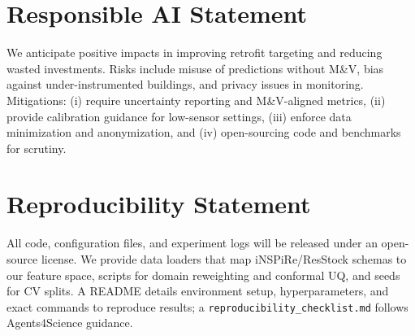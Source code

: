 ﻿\documentclass{article}
\begin{document}
\section*{Responsible AI Statement}
We anticipate positive impacts in improving retrofit targeting and reducing wasted investments. Risks include misuse of predictions without M\&V, bias against under-instrumented buildings, and privacy issues in monitoring. Mitigations: (i) require uncertainty reporting and M\&V-aligned metrics, (ii) provide calibration guidance for low-sensor settings, (iii) enforce data minimization and anonymization, and (iv) open-sourcing code and benchmarks for scrutiny.

\section*{Reproducibility Statement}
All code, configuration files, and experiment logs will be released under an open-source license. We provide data loaders that map iNSPiRe/ResStock schemas to our feature space, scripts for domain reweighting and conformal UQ, and seeds for CV splits. A README details environment setup, hyperparameters, and exact commands to reproduce results; a \texttt{reproducibility\_checklist.md} follows Agents4Science guidance.



\end{document}
